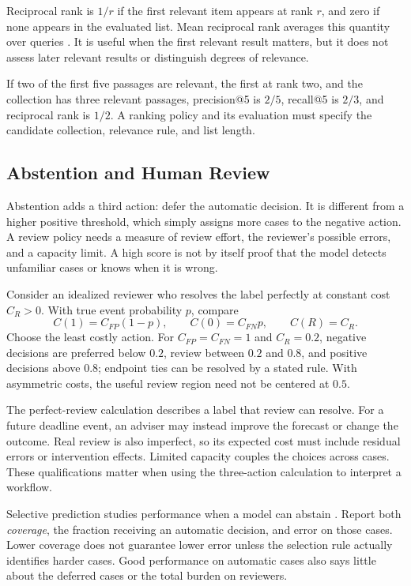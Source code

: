Reciprocal rank is $1/r$ if the first relevant item appears at rank $r$, and zero if none appears in the evaluated list. Mean reciprocal rank averages this quantity over queries \citep{pottskhattab2023ir}. It is useful when the first relevant result matters, but it does not assess later relevant results or distinguish degrees of relevance.

If two of the first five passages are relevant, the first at rank two, and the collection has three relevant passages, precision@5 is $2/5$, recall@5 is $2/3$, and reciprocal rank is $1/2$. A ranking policy and its evaluation must specify the candidate collection, relevance rule, and list length.

\subsection{Abstention and Human Review}

Abstention adds a third action: defer the automatic decision. It is different from a higher positive threshold, which simply assigns more cases to the negative action. A review policy needs a measure of review effort, the reviewer's possible errors, and a capacity limit. A high score is not by itself proof that the model detects unfamiliar cases or knows when it is wrong.

Consider an idealized reviewer who resolves the label perfectly at constant cost $C_R>0$. With true event probability $p$, compare
\[
C(1)=C_{FP}(1-p),\qquad C(0)=C_{FN}p,\qquad C(R)=C_R.
\]
Choose the least costly action. For $C_{FP}=C_{FN}=1$ and $C_R=0.2$, negative decisions are preferred below $0.2$, review between $0.2$ and $0.8$, and positive decisions above $0.8$; endpoint ties can be resolved by a stated rule. With asymmetric costs, the useful review region need not be centered at $0.5$.

The perfect-review calculation describes a label that review can resolve. For a future deadline event, an adviser may instead improve the forecast or change the outcome. Real review is also imperfect, so its expected cost must include residual errors or intervention effects. Limited capacity couples the choices across cases. These qualifications matter when using the three-action calculation to interpret a workflow.

Selective prediction studies performance when a model can abstain \citep{geifman2017}. Report both \emph{coverage}, the fraction receiving an automatic decision, and error on those cases. Lower coverage does not guarantee lower error unless the selection rule actually identifies harder cases. Good performance on automatic cases also says little about the deferred cases or the total burden on reviewers.

